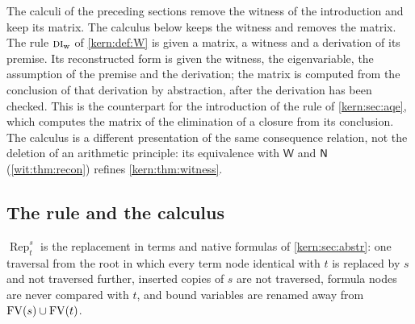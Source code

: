 The calculi of the preceding sections remove the witness of the
introduction and keep its matrix.  The calculus below keeps the witness and
removes the matrix.  The rule $\rulename{DI}_{\mathrm{w}}$ of
\cref{kern:def:W} is given a matrix, a witness and a derivation of its
premise.  Its reconstructed form is given the witness, the eigenvariable, the
assumption of the premise and the derivation; the matrix is computed from the
conclusion of that derivation by abstraction, after the derivation has been
checked.  This is the counterpart for the introduction of the rule
 of \cref{kern:sec:aqe}, which computes the matrix of the
elimination of a closure from its conclusion.  The calculus is a different
presentation of the same consequence relation, not the deletion of an
arithmetic principle: its equivalence with $\mathsf{W}$ and $\mathsf{N}$
(\cref{wit:thm:recon}) refines \cref{kern:thm:witness}.

\subsection{The rule and the calculus}
\label{wit:sec:recon-rule}

$\operatorname{Rep}_{t}^{s}$ is the replacement in terms and native formulas
of \cref{kern:sec:abstr}: one traversal from the root in which every term node
identical with $t$ is replaced by $s$ and not traversed further, inserted
copies of $s$ are not traversed, formula nodes are never compared with $t$,
and bound variables are renamed away from $\operatorname{FV}(s)\cup\operatorname{FV}(t)$.

